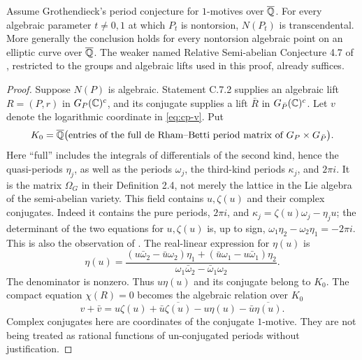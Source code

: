 \begin{statement}
Assume Grothendieck's period conjecture for $1$-motives over
$\overline{\mathbb Q}$. For every algebraic parameter $t\ne0,1$ at
which $P_t$ is nontorsion, $N(P_t)$ is transcendental.
More generally the conclusion holds for every nontorsion
algebraic point on an elliptic curve over $\overline{\mathbb Q}$.
The weaker named Relative Semi-abelian Conjecture 4.7 of
\citet{bertolin2022}, restricted to the groups and algebraic
lifts used in this proof, already suffices.
\end{statement}
\begin{proof}
Suppose $N(P)$ is algebraic. Statement C.7.2 supplies an
algebraic lift $R=(P,r)$ in $G_P(\mathbb C)^c$, and its conjugate
supplies a lift $\bar R$ in $G_{\bar P}(\mathbb C)^c$.
Let $v$ denote the logarithmic coordinate in
\eqref{eq:cp-v}. Put
\[
 K_0=\overline{\mathbb Q}\bigl(\text{entries of the full de Rham--Betti
                    period matrix of }G_P\times G_{\bar P}\bigr).
\]
Here ``full'' includes the integrals of differentials of the second
kind, hence the quasi-periods $\eta_j$, as well as the periods
$\omega_j$, the third-kind periods $\kappa_j$, and $2\pi i$.
It is the matrix $\Omega_G$ in their Definition 2.4, not merely
the lattice in the Lie algebra of the semi-abelian variety.
This field contains $u,\zeta(u)$ and their complex conjugates.
Indeed it contains the pure periods, $2\pi i$, and
$\kappa_j=\zeta(u)\omega_j-\eta_j u$; the determinant of
the two equations for $u,\zeta(u)$ is, up to sign,
$\omega_1\eta_2-\omega_2\eta_1= -2\pi i$.
This is also the observation of \citet[Remark 4.13]{bertolin2022}.
The real-linear expression for $\eta(u)$ is
\begin{equation}\label{eq:cp-real-linear}
 \eta(u)=
 \frac{(u\bar\omega_2-\bar u\omega_2)\eta_1
       +(\bar u\omega_1-u\bar\omega_1)\eta_2}
      {\omega_1\bar\omega_2-\bar\omega_1\omega_2}.
\end{equation}
The denominator is nonzero. Thus $u\eta(u)$ and its conjugate
belong to $K_0$. The compact equation $\chi(R)=0$ becomes
the algebraic relation over $K_0$
\begin{equation}\label{eq:cp-relation}
 v+\bar v
 =u\zeta(u)+\bar u\overline{\zeta(u)}
                -u\eta(u)-\bar u\overline{\eta(u)}.
\end{equation}
Complex conjugates here are coordinates of the conjugate
$1$-motive. They are not being treated as rational functions
of un-conjugated periods without justification.


\end{proof}
